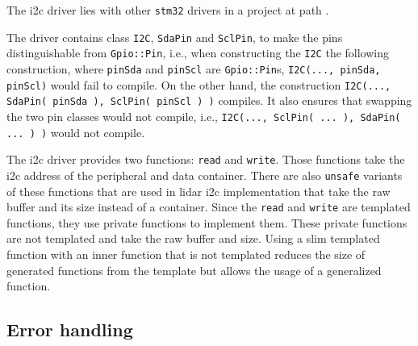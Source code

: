\documentclass[
  digital,     %
  oneside,     %
  nosansbold,  %
  nocolorbold, %
  nolof,         %
  nolot,         %
]{fithesis4}
\begin{document}
{{{The \acrshort{i2c} driver lies with other \verb|stm32| drivers in a project at path .

The driver contains class \lstinline|I2C|, \lstinline|SdaPin| and \lstinline|SclPin|, to make the pins distinguishable from \lstinline|Gpio::Pin|, i.e., when constructing the \lstinline|I2C| the following construction, where \lstinline|pinSda| and \lstinline|pinScl| are \lstinline|Gpio::Pin|s, \lstinline|I2C(..., pinSda, pinScl)| would fail to compile. On the other hand, the construction \lstinline|I2C(..., SdaPin( pinSda ), SclPin( pinScl ) )| compiles. It also ensures that swapping the two pin classes would not compile, i.e., \lstinline|I2C(..., SclPin( ... ), SdaPin( ... ) )| would not compile.

The \acrshort{i2c} driver provides two functions: \lstinline|read| and \lstinline|write|. Those functions take the \acrshort{i2c} address of the peripheral and data container. There are also \lstinline|unsafe| variants of these functions that are used in \acrshort{lidar} \acrshort{i2c} implementation %
that take the raw buffer and its size instead of a container. Since the \lstinline|read| and \lstinline|write| are templated functions, they use private functions to implement them. These private functions are not templated and take the raw buffer and size. Using a slim templated function with an inner function that is not templated reduces the size of generated functions from the template but allows the usage of a generalized function.

\subsection{ Error handling }

}}}
\end{document}
